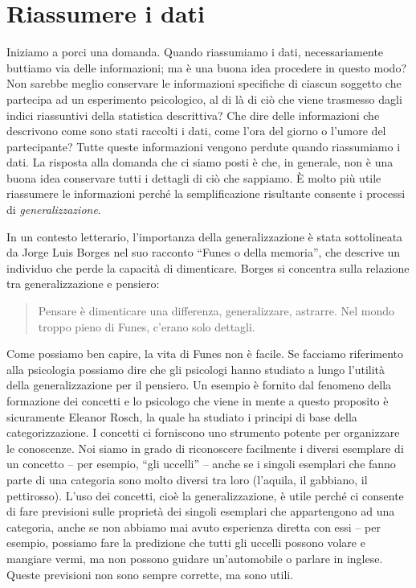 \documentclass[
  10pt,
  italian,
  a4paper,
  extrafontsizes,onecolumn,openright
  ]{memoir}
\theoremstyle{definition}
\theoremstyle{definition}
\theoremstyle{definition}
\theoremstyle{definition}
\theoremstyle{remark}
\begin{document}
\hypertarget{riassumere-i-dati}{%
\section{Riassumere i dati}\label{riassumere-i-dati}}

Iniziamo a porci una domanda. Quando riassumiamo i dati, necessariamente buttiamo via delle informazioni; ma è una buona idea procedere in questo modo? Non sarebbe meglio conservare le informazioni specifiche di ciascun soggetto che partecipa ad un esperimento psicologico, al di là di ciò che viene trasmesso dagli indici riassuntivi della statistica descrittiva? Che dire delle informazioni che descrivono come sono stati raccolti i dati, come l'ora del giorno o l'umore del partecipante? Tutte queste informazioni vengono perdute quando riassumiamo i dati. La risposta alla domanda che ci siamo posti è che, in generale, non è una buona idea conservare tutti i dettagli di ciò che sappiamo. È molto più utile riassumere le informazioni perché la semplificazione risultante consente i processi di \emph{generalizzazione}.

In un contesto letterario, l'importanza della generalizzazione è stata
sottolineata da Jorge Luis Borges nel suo racconto ``Funes o della
memoria'', che descrive un individuo che perde la capacità di
dimenticare. Borges si concentra sulla relazione tra generalizzazione e
pensiero:

\begin{quote}
Pensare è dimenticare una differenza, generalizzare, astrarre. Nel mondo troppo pieno di Funes, c'erano solo dettagli.
\end{quote}

Come possiamo ben capire, la vita di Funes non è facile. Se facciamo
riferimento alla psicologia possiamo dire che gli psicologi hanno
studiato a lungo l'utilità della generalizzazione per il pensiero. Un
esempio è fornito dal fenomeno della formazione dei concetti e lo
psicologo che viene in mente a questo proposito è sicuramente Eleanor
Rosch, la quale ha studiato i principi di base della categorizzazione. I
concetti ci forniscono uno strumento potente per organizzare le
conoscenze. Noi siamo in grado di riconoscere facilmente i diversi
esemplare di un concetto -- per esempio, ``gli uccelli'' -- anche se i
singoli esemplari che fanno parte di una categoria sono molto diversi
tra loro (l'aquila, il gabbiano, il pettirosso). L'uso dei concetti, cioè
la generalizzazione, è utile perché ci consente di fare previsioni sulle
proprietà dei singoli esemplari che appartengono ad una categoria, anche
se non abbiamo mai avuto esperienza diretta con essi -- per esempio,
possiamo fare la predizione che tutti gli uccelli possono volare e
mangiare vermi, ma non possono guidare un'automobile o parlare in
inglese. Queste previsioni non sono sempre corrette, ma sono utili.
\end{document}
